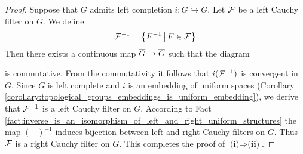 \documentclass[10pt]{amsart}
\begin{document}
\begin{proof}
	Suppose that $G$ admits left completion $i:G \hookrightarrow \overline{G}$. Let ${\mathcal F}$ be a left Cauchy filter on $G$. We define
	$${\mathcal F}^{-1} = \big\{F^{-1}\,\big|\,F\in {\mathcal F}\big\}$$
	Then there exists a continuous map $\overline{G}\rightarrow \overline{G}$ such that the diagram
	\begin{center}
	\end{center}
	is commutative. From the commutativity it follows that $i({\mathcal F}^{-1})$ is convergent in $\overline{G}$. Since $\overline{G}$ is left complete and $i$ is an embedding of uniform spaces (Corollary \ref{corollary:topological_groups_embeddings_is_uniform_embedding}), we derive that ${\mathcal F}^{-1}$ is a left Cauchy filter on $G$. According to Fact \ref{fact:inverse_is_an_isomorphism_of_left_and_right_uniform_structures} the map $(-)^{-1}$ induces bijection between left and right Cauchy filters on $G$. Thus ${\mathcal F}$ is a right Cauchy filter on $G$. This completes the proof of $\textbf{(i)}\Rightarrow \textbf{(ii)}$.


\end{proof}
\end{document}
